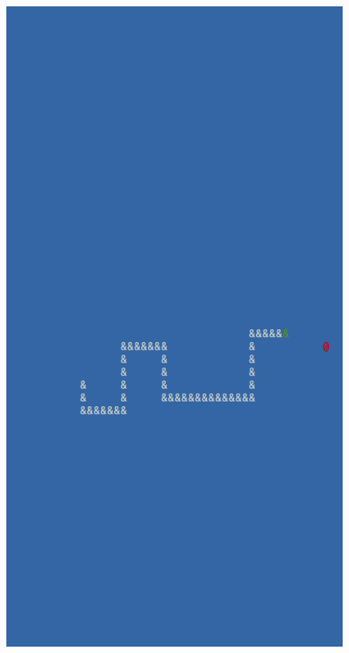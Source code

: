 \documentclass{beamer}
\begin{document}
\begin{frame}
\begin{columns}
\begin{column}{0.375\textwidth}
\begin{figure}
				\includegraphics[width=\columnwidth-\columnsep]{Presentation/snake.png}
			\end{figure}
		\end{column}
	\end{columns}
\end{frame}
\end{document}
